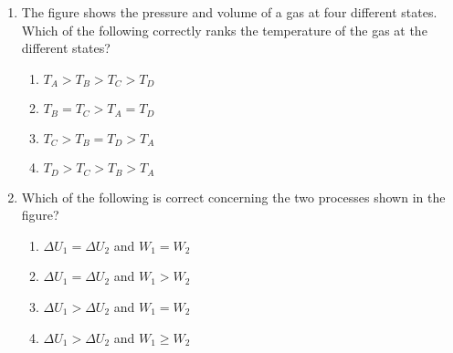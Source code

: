 \documentclass{../../oss-apphys}
\begin{document}
\begin{multicols}{2}
\begin{enumerate}[leftmargin=18pt,start=3]
  \item The figure shows the pressure and volume of a gas at four different
    states. Which of the following correctly ranks the temperature of the gas
    at the different states?
    \begin{center}
      \vspace{-.15in}
    \end{center}
    \begin{enumerate}[noitemsep,topsep=0pt,leftmargin=18pt,label=(\Alph*)]
    \item $T_A>T_B>T_C>T_D$
    \item $T_B=T_C>T_A=T_D$
    \item $T_C>T_B=T_D>T_A$
    \item $T_D>T_C>T_B>T_A$
    \end{enumerate}

    \columnbreak
    
  \item Which of the following is correct concerning the two processes shown
    in the figure?
    \begin{center}
      \vspace{-.15in}
    \end{center}
    \begin{enumerate}[noitemsep,topsep=0pt,leftmargin=18pt,label=(\Alph*)]
    \item $\Delta U_1 = \Delta U_2$ and $W_1= W_2$
    \item $\Delta U_1 = \Delta U_2$ and $W_1>W_2$
    \item $\Delta U_1 > \Delta U_2$ and $W_1=W_2$
    \item $\Delta U_1 > \Delta U_2$ and $W_1\geq W_2$
    \end{enumerate}
  

\end{enumerate}
\end{multicols}
\end{document}
